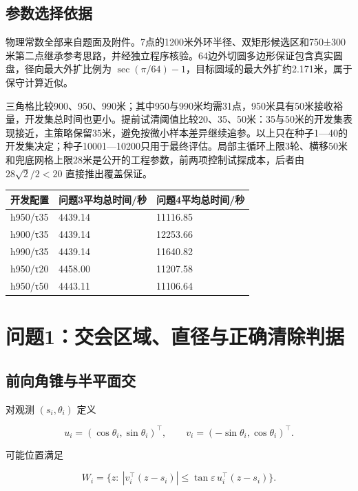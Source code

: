 \documentclass[
  chinese,
  UTF8,
  a4paper,
  zihao=-4]{ctexart}
\begin{document}
\subsection{参数选择依据}\label{ux53c2ux6570ux9009ux62e9ux4f9dux636e}

物理常数全部来自题面及附件。7点的1200米外环半径、双矩形候选区和750±300米第二点继承参考思路，并经独立程序核验。64边外切圆多边形保证包含真实圆盘，径向最大外扩比例为
\(\sec(\pi/64)-1\)，目标圆域的最大外扩约2.171米，属于保守计算近似。

三角格比较900、950、990米；其中950与990米均需31点，950米具有50米接收裕量，开发集总时间也更小。提前试清阈值比较20、35、50米：35与50米的开发集表现接近，主策略保留35米，避免按微小样本差异继续追参。以上只在种子1---40的开发集决定；种子10001---10200只用于最终评估。局部主循环上限3轮、横移50米和兜底网格上限28米是公开的工程参数，前两项控制试探成本，后者由
\(28\sqrt2/2<20\) 直接推出覆盖保证。

\begin{longtable}[]{@{}lll@{}}
\toprule\noalign{}
开发配置 & 问题3平均总时间/秒 & 问题4平均总时间/秒 \\
\midrule\noalign{}
\endhead
\bottomrule\noalign{}
\endlastfoot
h950/τ35 & 4439.14 & 11116.85 \\
h900/τ35 & 4439.14 & 12253.66 \\
h990/τ35 & 4439.14 & 11640.82 \\
h950/τ20 & 4458.00 & 11207.58 \\
h950/τ50 & 4443.11 & 11106.64 \\
\end{longtable}

\section{问题1：交会区域、直径与正确清除判据}\label{ux95eeux98981ux4ea4ux4f1aux533aux57dfux76f4ux5f84ux4e0eux6b63ux786eux6e05ux9664ux5224ux636e}

\subsection{前向角锥与半平面交}\label{ux524dux5411ux89d2ux9525ux4e0eux534aux5e73ux9762ux4ea4}

对观测 \((s_i,\theta_i)\) 定义

\[
u_i=(\cos\theta_i,\sin\theta_i)^\top,\qquad
v_i=(-\sin\theta_i,\cos\theta_i)^\top.
\]

可能位置满足

\[
W_i=\{z:\ |v_i^\top(z-s_i)|\le\tan\varepsilon\,u_i^\top(z-s_i)\}. \tag{2}
\]
\end{document}
